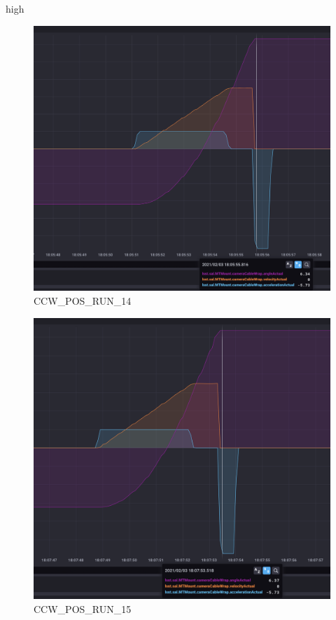 high\documentclass[SE,lsstdraft,authoryear,toc]{lsstdoc}
\begin{document}
\begin{figure}[h!]
  \includegraphics[width=\linewidth]{media/CCW_design_speed_pos_test14.png}
  \caption{CCW\_POS\_RUN\_14}
  \label{fig:CCW_POS_RUN_14}
\end{figure}
\begin{figure}[h!]
  \includegraphics[width=\linewidth]{media/CCW_design_speed_pos_test15.png}
  \caption{CCW\_POS\_RUN\_15}
  \label{fig:CCW_POS_RUN_15}
\end{figure}
\end{document}
